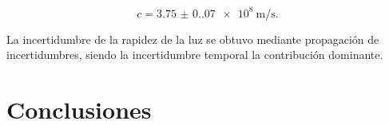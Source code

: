\documentclass[12pt]{IEEEtran}
\begin{document}
\begin{equation*}
	c = \qty[per-mode=symbol]{3.75(0.07)e8}{\m\per\second}.
\end{equation*}

La incertidumbre de la rapidez de la luz se obtuvo mediante propagación de
incertidumbres, siendo la incertidumbre temporal la contribución dominante.

\section{Conclusiones}
\kant[4]

\nocite{*}
\clearpage
\printbibliography
\end{document}
